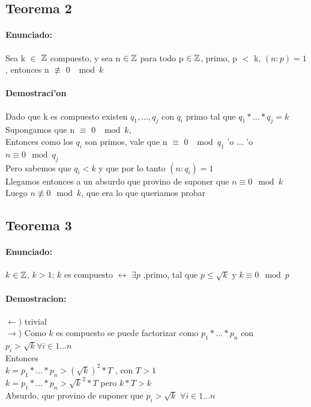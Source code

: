 \subsection{Teorema 2}
\paragraph{Enunciado:}
Sea k $\in$ ${\mathbb Z}$ compuesto, y sea n ${\in {\mathbb Z}}$ para todo p ${\in {\mathbb Z}}$, primo, p $<$ k, $(n:p) = 1$, entonces n $\not\equiv$ 0 $\mod{k}$
\paragraph{Demostraci'on}
Dado que k es compuesto existen $q_1,\ldots,q_j$ con $q_i$ primo tal que $q_1*\ldots*q_j = k$ \\
Supongamos que n $\equiv$ 0 $\mod{k}$,\\
Entonces como los $q_i$ son primos, vale que n $\equiv$ 0 $\mod{q_1}$ 'o ... 'o $n \equiv 0 \mod{q_j}$ \\
Pero sabemos que $q_i < k$ y que por lo tanto $(n:q_{i}) = 1$ \\
Llegamos entonces a un absurdo que provino de suponer que  $n \equiv 0 \mod{k}$ \\ 
Luego $n \not\equiv 0 \mod{k}$, que era lo que queriamos probar

\subsection{Teorema 3}
\paragraph{Enunciado:}
$k$ ${\in {\mathbb Z}}$, $k>1$; $k$ es compuesto $\longleftrightarrow$ $\exists p$ ,primo, tal que $p \leq \sqrt{k}$ y $k \equiv 0 \mod{p}$ \\
\paragraph{Demostracion:}
$\leftarrow)$ trivial \\
$\rightarrow$) Como $k$ es compuesto se puede factorizar como $p_1*...*p_n$ con $p_i > \sqrt{k} \forall i \in {1...n}$\\
Entonces \\
$k = p_1*...*p_n > (\sqrt{k})^2*T$ , con $T>1$\\  
$k = p_1*...*p_n > \sqrt{k}^2*T$ pero $k*T > k$ \\
Absurdo, que provino de suponer que $p_i > \sqrt{k}$ $\forall i \in {1...n}$\\

